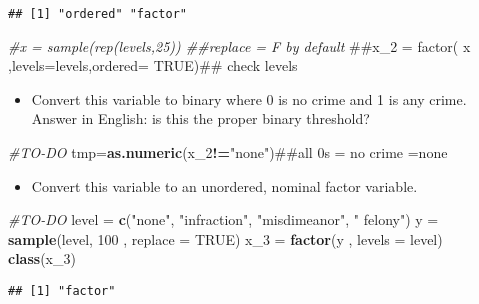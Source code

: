 \documentclass[]{article}
\newenvironment{Shaded}{\begin{snugshade}}{\end{snugshade}}
\newcommand{\KeywordTok}[1]{\textcolor[rgb]{0.13,0.29,0.53}{\textbf{#1}}}
\newcommand{\DataTypeTok}[1]{\textcolor[rgb]{0.13,0.29,0.53}{#1}}
\newcommand{\DecValTok}[1]{\textcolor[rgb]{0.00,0.00,0.81}{#1}}
\newcommand{\StringTok}[1]{\textcolor[rgb]{0.31,0.60,0.02}{#1}}
\newcommand{\CommentTok}[1]{\textcolor[rgb]{0.56,0.35,0.01}{\textit{#1}}}
\newcommand{\OtherTok}[1]{\textcolor[rgb]{0.56,0.35,0.01}{#1}}
\newcommand{\OperatorTok}[1]{\textcolor[rgb]{0.81,0.36,0.00}{\textbf{#1}}}
\newcommand{\NormalTok}[1]{#1}
\providecommand{\tightlist}{%
  \setlength{\itemsep}{0pt}\setlength{\parskip}{0pt}}
\begin{document}
\begin{verbatim}
## [1] "ordered" "factor"
\end{verbatim}

\begin{Shaded}
\begin{Highlighting}[]
\CommentTok{#x =  sample(rep(levels,25)) ##replace = F by default}
\NormalTok{##x_2 = factor( x ,levels=levels,ordered= TRUE)## check levels}
\end{Highlighting}
\end{Shaded}

\begin{itemize}
\tightlist
\item
  Convert this variable to binary where 0 is no crime and 1 is any
  crime. Answer in English: is this the proper binary threshold?
\end{itemize}

\begin{Shaded}
\begin{Highlighting}[]
\CommentTok{#TO-DO}
\NormalTok{tmp=}\KeywordTok{as.numeric}\NormalTok{(x_}\DecValTok{2}\OperatorTok{!=}\StringTok{"none"}\NormalTok{)##all 0s = no crime =none}
\end{Highlighting}
\end{Shaded}

\begin{itemize}
\tightlist
\item
  Convert this variable to an unordered, nominal factor variable.
\end{itemize}

\begin{Shaded}
\begin{Highlighting}[]
\CommentTok{#TO-DO}
\NormalTok{level =}\StringTok{ }\KeywordTok{c}\NormalTok{(}\StringTok{"none"}\NormalTok{, }\StringTok{"infraction"}\NormalTok{, }\StringTok{"misdimeanor"}\NormalTok{, }\StringTok{" felony"}\NormalTok{)}
\NormalTok{y =}\StringTok{ }\KeywordTok{sample}\NormalTok{(level, }\DecValTok{100}\NormalTok{ , }\DataTypeTok{replace =} \OtherTok{TRUE}\NormalTok{)}
\NormalTok{x_}\DecValTok{3}\NormalTok{ =}\StringTok{ }\KeywordTok{factor}\NormalTok{(y , }\DataTypeTok{levels =}\NormalTok{ level)}
\KeywordTok{class}\NormalTok{(x_}\DecValTok{3}\NormalTok{)}
\end{Highlighting}
\end{Shaded}

\begin{verbatim}
## [1] "factor"
\end{verbatim}
\end{document}
